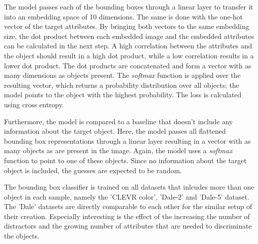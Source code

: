 The model passes each of the bounding boxes through a linear layer to transfer it into an embedding space of 10 dimensions.
The same is done with the one-hot vector of the target attributes.
By bringing both vectors to the same embedding size, the dot product between each embedded image and the embedded attributes can be calculated in the next step.
A high correlation between the attributes and the object should result in a high dot product, while a low correlation results in a lower dot product.
The dot products are concatenated and form a vector with as many dimensions as objects present.
The \emph{softmax} function is applied over the resulting vector, which returns a probability distribution over all objects; the model points to the object with the highest probability.
The loss is calculated using cross entropy.

Furthermore, the model is compared to a baseline that doesn't include any information about the target object.
Here, the model passes all flattened bounding box representations through a linear layer resulting in a vector with as many objects as are present in the image.
Again, the model uses a \emph{softmax} function to point to one of these objects.
Since no information about the target object is included, the guesses are expected to be random.

The bounding box classifier is trained on all datasets that inlcudes more than one object in each sample, namely the 'CLEVR color', 'Dale-2' and 'Dale-5' dataset.
The 'Dale' datasets are directly comparable to each other for the similar setup of their creation.
Especially interesting is the effect of the increasing the number of distractors and the growing number of attributes that are needed to discriminate the objects.

